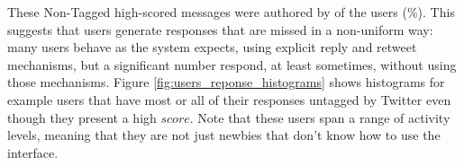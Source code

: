 These Non-Tagged high-scored messages were authored by \highUserCount{} of the \totalUsers{} users (\highUserCountPct{}\%). This suggests that users generate responses that are missed in a non-uniform way: many users behave as the system expects, using explicit reply and retweet mechanisms, but a significant number respond, at least sometimes, without using those mechanisms. 
Figure \ref{fig:users_reponse_histograms} shows histograms for example users that have most or all of their responses untagged by Twitter even though they present a high $score$.  Note that these users span a range of activity levels, meaning that they are not just newbies that don't know how to use the interface.

